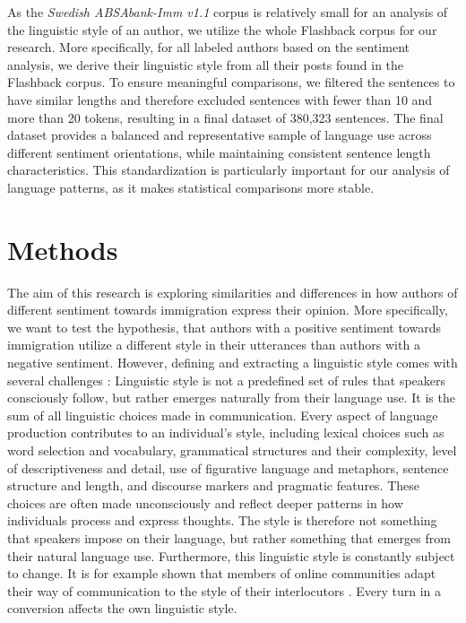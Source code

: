 \documentclass[11pt]{article}
\begin{document}
As the \emph{Swedish ABSAbank-Imm v1.1 } corpus is relatively small for an analysis of the linguistic style of an author, we utilize the whole Flashback corpus for our research.
More specifically, for all labeled authors based on the sentiment analysis, we derive their linguistic style from all their posts found in the Flashback corpus.
To ensure meaningful comparisons, we filtered the sentences to have similar lengths and therefore excluded sentences with fewer than 10 and more than 20 tokens, resulting in a final dataset of 380,323 sentences.
The final dataset provides a balanced and representative sample of language use across different sentiment orientations, while maintaining consistent sentence length characteristics.
This standardization is particularly important for our analysis of language patterns, as it makes statistical comparisons more stable.

\section{Methods}
The aim of this research is exploring similarities and differences in how authors of different sentiment towards immigration express their opinion.
More specifically, we want to test the hypothesis, that authors with a positive sentiment towards immigration utilize a different style in their utterances than authors with a negative sentiment.
However, defining and extracting a linguistic style comes with several challenges \citep{Berdicevskis2023a}:
Linguistic style is not a predefined set of rules that speakers consciously follow, but rather emerges naturally from their language use.
It is the sum of all linguistic choices made in communication.
Every aspect of language production contributes to an individual's style, including lexical choices such as word selection and vocabulary, grammatical structures and their complexity, level of descriptiveness and detail, use of figurative language and metaphors, sentence structure and length, and discourse markers and pragmatic features.
These choices are often made unconsciously and reflect deeper patterns in how individuals process and express thoughts.
The style is therefore not something that speakers impose on their language, but rather something that emerges from their natural language use.
Furthermore, this linguistic style is constantly subject to change.
It is for example shown that members of online communities adapt their way of communication to the style of their interlocutors \citet{DanescuNiculescuMizil2013,McPherson2001,Berdicevskis2023a}.
Every turn in a conversion affects the own linguistic style.
\end{document}
